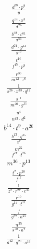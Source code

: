 \begin{align}
\frac{d^{28}\cdot p^{9}}{y}
\end{align}
\begin{align}
\frac{q^{14}\cdot x^{3}}{d^{26}}
\end{align}
\begin{align}
\frac{b^{62}\cdot c^{61}}{a^{53}}
\end{align}
\begin{align}
\frac{d^{24}\cdot g^{44}}{s^{10}}
\end{align}
\begin{align}
\frac{t^{16}}{f^{45}\cdot p^{9}}
\end{align}
\begin{align}
\frac{r^{30}}{m^{12}\cdot z^{6}}
\end{align}
\begin{align}
\frac{1}{s^{26}\cdot x^{33}\cdot q^{12}}
\end{align}
\begin{align}
\frac{s^{11}}{m^{20}\cdot g^{11}}
\end{align}
\begin{align}
\frac{y^{4}}{n^{43}\cdot d^{2}}
\end{align}
\begin{align}
b^{14}\cdot t^{9}\cdot a^{20}
\end{align}
\begin{align}
\frac{b^{13}\cdot q^{35}}{z^{7}}
\end{align}
\begin{align}
\frac{m^{22}}{f^{27}\cdot t^{26}}
\end{align}
\begin{align}
m^{36}\cdot p^{13}
\end{align}
\begin{align}
\frac{t^{2}\cdot p^{20}}{f^{17}}
\end{align}
\begin{align}
\frac{1}{z^{2}\cdot r^{27}\cdot c^{36}}
\end{align}
\begin{align}
\frac{r^{10}}{g^{17}\cdot t^{11}}
\end{align}
\begin{align}
\frac{f}{g^{35}\cdot a^{25}}
\end{align}
\begin{align}
\frac{n^{35}}{s^{10}\cdot a^{7}}
\end{align}
\begin{align}
\frac{1}{d^{42}\cdot g^{20}\cdot a^{13}}
\end{align}
